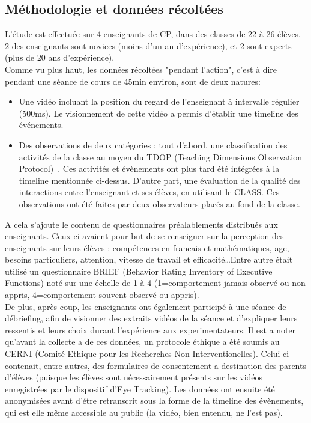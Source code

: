 \documentclass{article}
\begin{document}
\subsection{Méthodologie et données récoltées}
L'étude est effectuée sur 4 enseignants de CP, dans des classes de 22 à 26 élèves. 2 des enseignants sont novices (moins d'un an d'expérience), et 2 sont experts (plus de 20 ans d'expérience).\\
Comme vu plus haut, les données récoltées "pendant l'action", c'est à dire pendant une séance de cours de 45min environ, sont de deux natures:
\begin{itemize}
  \item Une vidéo incluant la position du regard de l'enseignant à intervalle régulier (500ms). Le visionnement de cette vidéo a permis d'établir une timeline des événements.
  \item Des observations de deux catégories : tout d'abord, une classification des activités de la classe au moyen du TDOP (Teaching Dimensions Observation Protocol)~\cite{TDOP}. Ces activités et évènements ont plus tard été intégrées à la timeline mentionnée ci-dessus. D'autre part, une évaluation de la qualité des interactions entre l'enseignant et ses élèves, en utilisant le CLASS. Ces observations ont été faites par deux observateurs placés au fond de la classe.
\end{itemize}
A cela s'ajoute le contenu de questionnaires préalablements distribués aux enseignants. Ceux ci avaient pour but de se renseigner sur la perception des enseignants sur leurs élèves : compétences en francais et mathématiques, age, besoins particuliers, attention, vitesse de travail et efficacité\ldots Entre autre était utilisé un questionnaire BRIEF (Behavior Rating Inventory of Executive Functions) noté sur une échelle de 1 à 4 (1=comportement jamais observé ou non appris, 4=comportement souvent observé ou appris).\\
De plus, après coup, les enseignants ont également participé à une séance de débriefing, afin de visionner des extraits vidéos de la séance et d'expliquer leurs ressentis et leurs choix durant l'expérience aux experimentateurs.
Il est a noter qu'avant la collecte a de ces données, un protocole éthique a été soumis au CERNI (Comité Ethique pour les Recherches Non Interventionelles). Celui ci contenait, entre autres, des formulaires de consentement a destination des parents d'élèves (puisque les élèves sont nécessairement présents sur les vidéos enregistrées par le dispositif d'Eye Tracking). Les données ont ensuite été anonymisées avant d'étre retranscrit sous la forme de la timeline des évènements, qui est elle même accessible au public (la vidéo, bien entendu, ne l'est pas).
\end{document}

